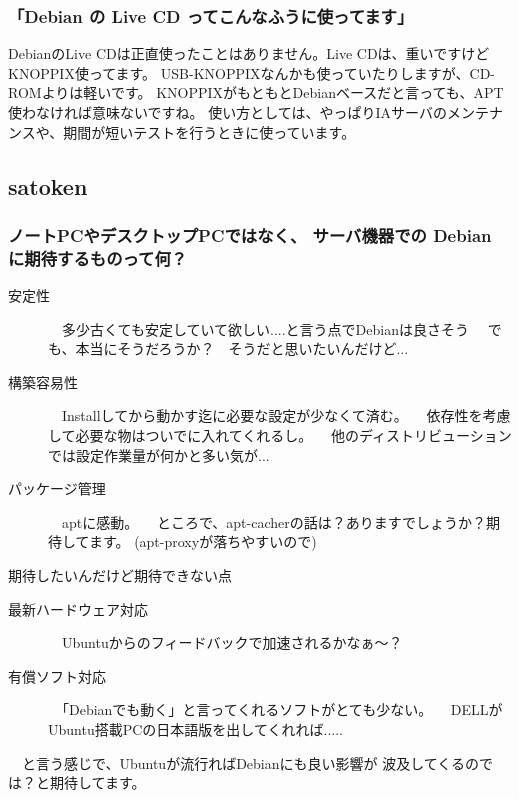 \documentclass[mingoth,a4paper]{jsarticle}
\begin{document}
\subsubsection{「Debian の Live CD ってこんなふうに使ってます」}
DebianのLive CDは正直使ったことはありません。Live CDは、重いですけどKNOPPIX使ってます。
USB-KNOPPIXなんかも使っていたりしますが、CD-ROMよりは軽いです。
KNOPPIXがもともとDebianベースだと言っても、APT使わなければ意味ないですね。
使い方としては、やっぱりIAサーバのメンテナンスや、期間が短いテストを行うときに使っています。

\subsection{satoken}

\subsubsection{ノートPCやデスクトップPCではなく、
サーバ機器での Debian に期待するものって何？}

\begin{description}
 \item[安定性]
 　多少古くても安定していて欲しい....と言う点でDebianは良さそう
 　でも、本当にそうだろうか？　そうだと思いたいんだけど...

 \item[構築容易性]
 　Installしてから動かす迄に必要な設定が少なくて済む。
 　依存性を考慮して必要な物はついでに入れてくれるし。
 　他のディストリビューションでは設定作業量が何かと多い気が...

 \item[パッケージ管理]
 　aptに感動。
 　ところで、apt-cacherの話は？ありますでしょうか？期待してます。
 (apt-proxyが落ちやすいので)
\end{description}

期待したいんだけど期待できない点

\begin{description}
 \item[最新ハードウェア対応]
 　Ubuntuからのフィードバックで加速されるかなぁ〜？

 \item[有償ソフト対応]
 　「Debianでも動く」と言ってくれるソフトがとても少ない。
 　DELLがUbuntu搭載PCの日本語版を出してくれれば.....
\end{description}


　と言う感じで、Ubuntuが流行ればDebianにも良い影響が
波及してくるのでは？と期待してます。
\end{document}
